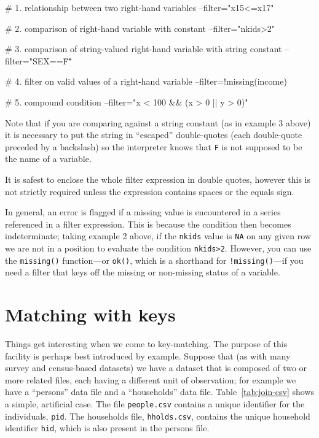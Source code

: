 \begin{code}
# 1. relationship between two right-hand variables
--filter="x15<=x17"

# 2. comparison of right-hand variable with constant
--filter="nkids>2"

# 3. comparison of string-valued right-hand variable with string constant
--filter="SEX==\"F\""

# 4. filter on valid values of a right-hand variable
--filter=!missing(income)

# 5. compound condition
--filter="x < 100 && (x > 0 || y > 0)"
\end{code}

Note that if you are comparing against a string constant (as in
example 3 above) it is necessary to put the string in ``escaped''
double-quotes (each double-quote preceded by a backslash) so the
interpreter knows that \texttt{F} is not supposed to be the name of a
variable.

It is safest to enclose the whole filter expression in double quotes,
however this is not strictly required unless the expression contains
spaces or the equals sign.

In general, an error is flagged if a missing value is encountered in
a series referenced in a filter expression. This is because the
condition then becomes indeterminate; taking example 2 above, if the
\texttt{nkids} value is \texttt{NA} on any given row we are not in a
position to evaluate the condition \texttt{nkids>2}. However, you can
use the \texttt{missing()} function---or \texttt{ok()}, which is a
shorthand for \texttt{!missing()}---if you need a filter that keys off
the missing or non-missing status of a variable.


\section{Matching with keys}
\label{sec:join-keys}

Things get interesting when we come to key-matching. The purpose of
this facility is perhaps best introduced by example.  Suppose that (as
with many survey and census-based datasets) we have a dataset that is
composed of two or more related files, each having a different unit of
observation; for example we have a ``persons'' data file and a
``households'' data file. Table~\ref{tab:join-csv} shows a simple,
artificial case. The file \texttt{people.csv} contains a unique
identifier for the individuals, \texttt{pid}. The households file,
\texttt{hholds.csv}, contains the unique household identifier
\texttt{hid}, which is also present in the persons file.

